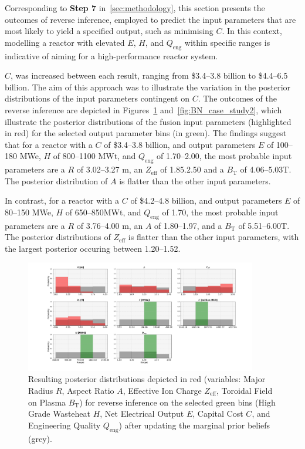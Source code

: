 \documentclass[journal]{IEEEtran}
\begin{document}
Corresponding to \textbf{Step 7} in~\ref{sec:methodology}, this section presents the outcomes of reverse inference, employed to predict the input parameters that are most likely to yield a specified output, such as minimising $C$. In this context, modelling a reactor with elevated $E$, $H$, and $Q_{\text{eng}}$ within specific ranges is indicative of aiming for a high-performance reactor system. 

$C$, was increased between each result, ranging from \$3.4--3.8 billion to \$4.4--6.5 billion. The aim of this approach was to illustrate the variation in the posterior distributions of the input parameters contingent on $C$. The outcomes of the reverse inference are depicted in Figures~\ref{fig:BN_case_study} and~\ref{fig:BN_case_study2}, which illustrate the posterior distributions of the fusion input parameters (highlighted in red) for the selected output parameter bins (in green). The findings suggest that for a reactor with a $C$ of \$3.4--3.8 billion, and output parameters $E$ of 100--180 MWe, $H$ of 800--1100 MWt, and $Q_{\text{eng}}$ of 1.70--2.00, the most probable input parameters are a $R$ of 3.02--3.27 m, an $Z_{\text{eff}}$ of 1.85.2.50 and a $B_{\text{T}}$ of 4.06--5.03T. The posterior distribution of $A$ is flatter than the other input parameters.  

In contrast, for a reactor with a $C$ of \$4.2--4.8 billion, and output parameters $E$ of 80--150 MWe, $H$ of 650--850MWt, and $Q_{\text{eng}}$ of 1.70, the most probable input parameters are a $R$ of 3.76--4.00 m, an $A$ of 1.80--1.97, and a $B_{\text{T}}$ of 5.51--6.00T. The posterior distributions of $Z_{\text{eff}}$ is flatter than the other input parameters, with the largest posterior occuring between 1.20--1.52.

\begin{figure}[t]
    \centering
    \includegraphics[width=0.9\textwidth]{figures/TE_results/config(44)_4outputs/Figure_4_v2.png}
    \caption{Resulting posterior distributions depicted in red (variables: Major Radius $R$, Aspect Ratio $A$, Effective Ion Charge $Z_{\text{eff}}$, Toroidal Field on Plasma $B_{\text{T}}$) for reverse
    inference on the selected green bins (High Grade Wasteheat $H$, Net Electrical Output $E$, Capital Cost $C$, and Engineering Quality $Q_{\text{eng}}$) after updating the marginal prior beliefs (grey).}\label{fig:BN_case_study}
\end{figure}
\end{document}
